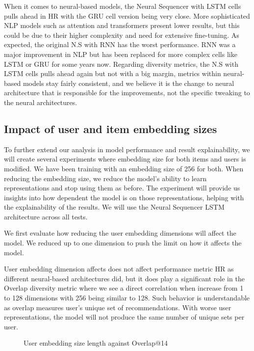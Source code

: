 \documentclass{kththesis}
\begin{document}
When it comes to neural-based models, the Neural Sequencer with LSTM cells pulls ahead in HR with the GRU cell version being very close. More sophisticated NLP models such as attention and transformers present lower results, but this could be due to their higher complexity and need for extensive fine-tuning. As expected, the original N.S with RNN has the worst performance. RNN was a major improvement in NLP but has been replaced for more complex cells like LSTM or GRU for some years now. Regarding diversity metrics, the N.S with LSTM cells pulls ahead again but not with a big margin, metrics within neural-based models stay fairly consistent, and we believe it is the change to neural architecture that is responsible for the improvements, not the specific tweaking to the neural architectures. 

\subsection{Impact of user and item embedding sizes}
To further extend our analysis in model performance and result explainability, we will create several experiments where embedding size for both items and users is modified. We have been training with an embedding size of 256 for both. When reducing the embedding size, we reduce the model's ability to learn representations and stop using them as before. The experiment will provide us insights into how dependent the model is on those representations, helping with the explainability of the results. We will use the Neural Sequencer LSTM architecture across all tests.

We first evaluate how reducing the user embedding dimensions will affect the model. We reduced up to one dimension to push the limit on how it affects the model. 

\begin{center}

\end{center}

User embedding dimension affects does not affect performance metric HR as different neural-based architectures did, but it does play a significant role in the Overlap diversity metric where we see a direct correlation when increase from 1 to 128 dimensions with 256 being similar to 128. Such behavior is understandable as overlap measures user's unique set of recommendations. With worse user representations, the model will not produce the same number of unique sets per user.

\begin{figure}[H]
\centering
{}
\caption{User embedding size length against Overlap@14}
\end{figure}
\end{document}
